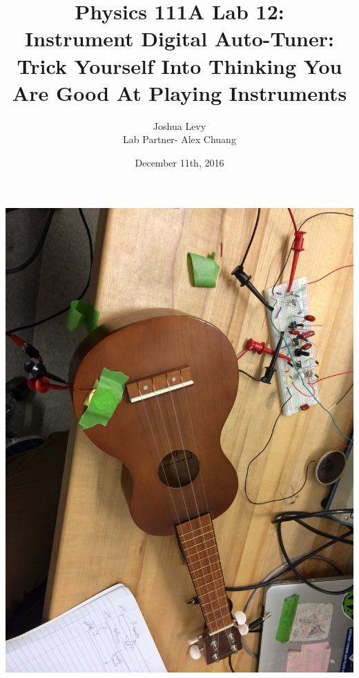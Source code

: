 \documentclass{article}
\title{Physics 111A Lab 12:\\ Instrument Digital Auto-Tuner: \\Trick Yourself Into Thinking You Are Good At Playing Instruments}
\author{Joshua Levy\\Lab Partner- Alex Chuang }
\date{December 11th, 2016}
\begin{document}
\maketitle

\begin{center}
    \includegraphics[scale = 0.07]{Auto1.JPG}
\end{center}
\end{document}
